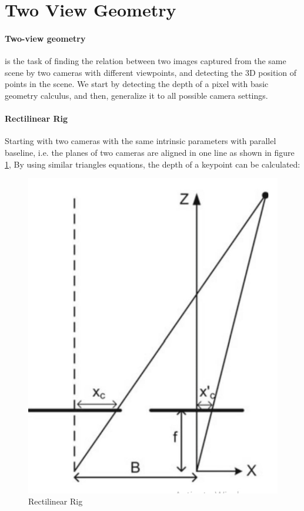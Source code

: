\documentclass[11pt]{article}
\begin{document}
    \section{Two View Geometry}

    \paragraph{Two-view geometry} is the task of finding the relation between two images captured from the same scene
    by two cameras with different viewpoints, and detecting the 3D position of points in the scene. We start by
    detecting the depth of a pixel with basic geometry calculus, and then, generalize it to all possible camera settings.

    \paragraph{Rectilinear Rig} Starting with two cameras with the same intrinsic parameters with parallel baseline, i.e. the planes of
    two cameras are aligned in one line as shown in figure \ref{fig:rect_rig}, By using similar triangles equations,
    the depth of a keypoint can be calculated:

    \begin{figure}
        \centering
        \includegraphics[scale=0.5]{images/two_view}
        \caption{Rectilinear Rig}
        \label{fig:rect_rig}
    \end{figure}
\end{document}
